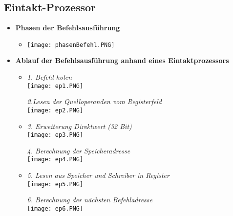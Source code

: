 \subsection{Eintakt-Prozessor}
    \begin{itemize}
        \item \textbf{Phasen der Befehlsausführung}
            \begin{itemize}
                \item[] \texttt{[image: phasenBefehl.PNG]}
            \end{itemize}

        \item \textbf{Ablauf der Befehlsausführung anhand eines Eintaktprozessors}
            \begin{itemize}
                \item[]
                    \begin{minipage}{0.45\textwidth}
                        \textit{1. Befehl holen} \\
                        \texttt{[image: ep1.PNG]}
                    \end{minipage}
                    \begin{minipage}{0.45\textwidth}
                        \textit{2.Lesen der Quelloperanden vom Registerfeld} \\
                        \texttt{[image: ep2.PNG]}
                    \end{minipage}
                \item[]
                    \begin{minipage}{0.45\textwidth}
                        \textit{3. Erweiterung Direktwert (32 Bit)} \\
                        \texttt{[image: ep3.PNG]}
                    \end{minipage}
                    \begin{minipage}{0.45\textwidth}
                        \textit{4. Berechnung der Speicheradresse} \\
                        \texttt{[image: ep4.PNG]}
                    \end{minipage}
                \item[]
                    \begin{minipage}{0.45\textwidth}
                        \textit{5. Lesen aus Speicher und Schreiber in Register} \\
                        \texttt{[image: ep5.PNG]}
                    \end{minipage}
                    \begin{minipage}{0.45\textwidth}
                        \textit{6. Berechnung der nächsten Befehladresse} \\
                        \texttt{[image: ep6.PNG]}
                    \end{minipage}
            \end{itemize}


\end{itemize}
